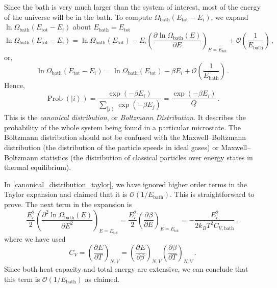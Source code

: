 \documentclass{article}
\theoremstyle{plain}\theoremheaderfont{\normalfont\bfseries}\theorembodyfont{\rmfamily}\theoremseparator{.}\newtheorem*{thm}{Theorem}\newtheorem*{law}{Law}\newtheorem*{pos}{Postulate}
\numberwithin{equation}{section}
\newcommand{\pdv}[3][]{\frac{\partial^{#1} #2}{{\partial #3}^{#1}}}
\newcommand{\ket}[1]{\left| #1 \right\rangle}
\newcommand{\bath}{\text{bath}}
\newcommand{\tot}{\text{tot}}
\DeclareMathOperator{\Prob}{Prob}
\begin{document}
    Since the bath is very much larger than the system of interest, most of the energy of the universe will be in the bath. To compute \(\Omega_{\bath}(E_{\tot}-E_i)\), we expand \(\ln\Omega_{\bath}(E_{\tot}-E_i)\) about \(E_{\bath}=E_{\tot}\)
    \begin{equation}\label{canonical_distribution_taylor}
        \ln\Omega_{\bath}(E_{\tot}-E_i)=\ln\Omega_{\bath}(E_{\tot})-E_i\left(\pdv{\ln\Omega_{\bath}(E)}{E}\right)_{E=E_{\tot}}+\mathcal{O}\left(\frac{1}{E_{\bath}}\right)\,,
    \end{equation}
    or,
    \begin{equation}
        \ln\Omega_{\bath}(E_{\tot}-E_i)=\ln\Omega_{\bath}(E_{\tot})-\beta E_i+\mathcal{O}\left(\frac{1}{E_{\bath}}\right)\,.
    \end{equation}
    Hence,
    \begin{equation}\label{canonical_distribution}
        \Prob(\ket{i})=\frac{\exp(-\beta E_i)}{\sum_{\ket{j}}\exp(-\beta E_j)}=\frac{\exp(-\beta E_i)}{Q}\,.
    \end{equation}
    This is the \textit{canonical distribution}, or \textit{Boltzmann Distribution}. It describes the probability of the whole system being found in a particular microstate. The Boltzmann distribution should not be confused with the Maxwell--Boltzmann distribution (the distribution of the particle speeds in ideal gases) or Maxwell--Boltzmann statistics (the distribution of classical particles over energy states in thermal equilibrium).

    In \cref{canonical_distribution_taylor}, we have ignored higher order terms in the Taylor expansion and claimed that it is \(\mathcal{O}(1/E_{\bath})\). This is straightforward to prove. The next term in the expansion is
    \begin{equation}
        \frac{E_i^2}{2}\left(\pdv[2]{\ln\Omega_{\bath}(E)}{E}\right)_{E=E_{\tot}}=\frac{E_i^2}{2}\left(\pdv{\beta}{E}\right)_{E=E_{\tot}}=-\frac{E_i^2}{2k_BT^2C_{V,\bath}}\,,
    \end{equation}
    where we have used
    \begin{equation}
        C_V=\left(\pdv{E}{T}\right)_{N,V}=\left(\pdv{E}{\beta}\right)_{N,V}\left(\pdv{\beta}{T}\right)_{N,V}\,.
    \end{equation}
    Since both heat capacity and total energy are extensive, we can conclude that this term is \(\mathcal{O}(1/E_{\bath})\) as claimed.
\end{document}

